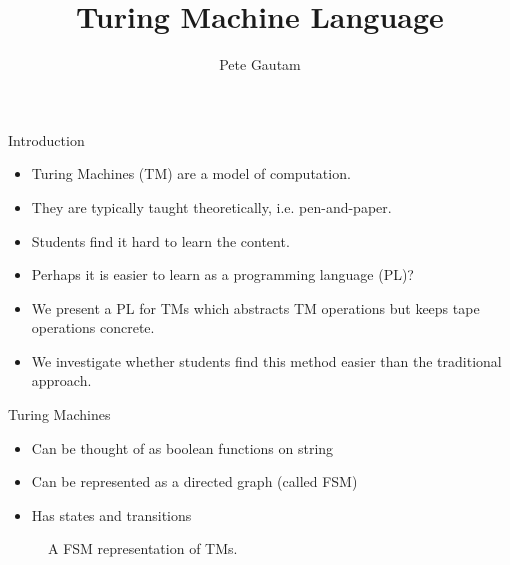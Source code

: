 \documentclass{beamer}
\title{Turing Machine Language}
\author{Pete Gautam}
\institute{University of Glasgow}
\begin{document}
    \frame{\titlepage}

    \begin{frame}{Introduction}
        \begin{itemize}
            \item Turing Machines (TM) are a model of computation.
            \item They are typically taught theoretically, i.e. pen-and-paper.
            \item Students find it hard to learn the content.
            \item Perhaps it is easier to learn as a programming language (PL)?
            \item We present a PL for TMs which abstracts TM operations but keeps tape operations concrete.
            \item We investigate whether students find this method easier than the traditional approach.
        \end{itemize}
    \end{frame}

    \begin{frame}{Turing Machines}
        \begin{itemize}
            \item Can be thought of as boolean functions on string
            \item Can be represented as a directed graph (called FSM)
            \item Has states and transitions
        \end{itemize}

        \begin{figure}[htb]
            \centering
            \caption{A FSM representation of TMs.}
        \end{figure}
    \end{frame}
    
\end{document}

